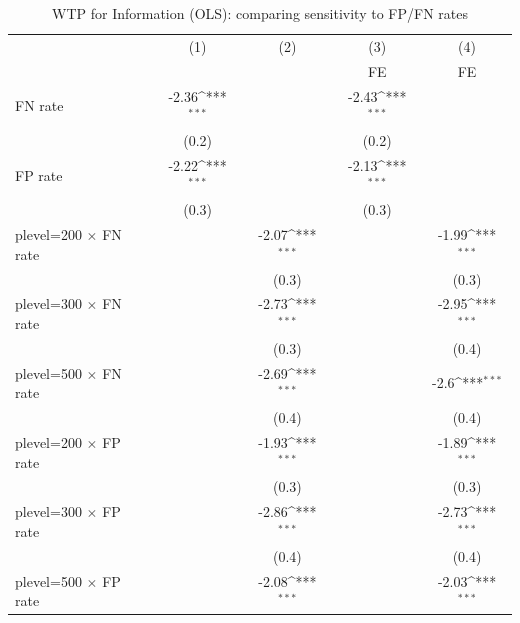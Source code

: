 \begin{table}[htbp]\centering
\def\sym#1{\ifmmode^{#1}\else\(^{#1}\)\fi}
\caption{WTP for Information (OLS): comparing sensitivity to FP/FN rates}
\begin{tabular}{l*{4}{c}}
\hline\hline
                &\multicolumn{1}{c}{(1)}&\multicolumn{1}{c}{(2)}&\multicolumn{1}{c}{(3)}&\multicolumn{1}{c}{(4)}\\
                &\multicolumn{1}{c}{}&\multicolumn{1}{c}{}&\multicolumn{1}{c}{FE}&\multicolumn{1}{c}{FE}\\
\hline
FN rate         &    -2.36\sym{***}&                  &    -2.43\sym{***}&                  \\
                &    (0.2)         &                  &    (0.2)         &                  \\
FP rate         &    -2.22\sym{***}&                  &    -2.13\sym{***}&                  \\
                &    (0.3)         &                  &    (0.3)         &                  \\
plevel=200 $\times$ FN rate&                  &    -2.07\sym{***}&                  &    -1.99\sym{***}\\
                &                  &    (0.3)         &                  &    (0.3)         \\
plevel=300 $\times$ FN rate&                  &    -2.73\sym{***}&                  &    -2.95\sym{***}\\
                &                  &    (0.3)         &                  &    (0.4)         \\
plevel=500 $\times$ FN rate&                  &    -2.69\sym{***}&                  &     -2.6\sym{***}\\
                &                  &    (0.4)         &                  &    (0.4)         \\
plevel=200 $\times$ FP rate&                  &    -1.93\sym{***}&                  &    -1.89\sym{***}\\
                &                  &    (0.3)         &                  &    (0.3)         \\
plevel=300 $\times$ FP rate&                  &    -2.86\sym{***}&                  &    -2.73\sym{***}\\
                &                  &    (0.4)         &                  &    (0.4)         \\
plevel=500 $\times$ FP rate&                  &    -2.08\sym{***}&                  &    -2.03\sym{***}\\

\end{tabular}
\end{table}
